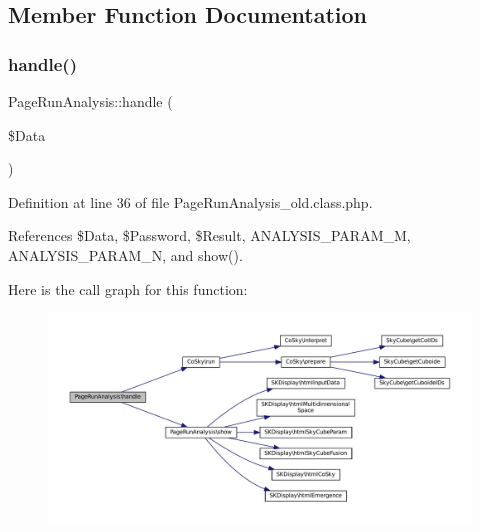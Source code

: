 \subsection{Member Function Documentation}
\mbox{\label{class_page_run_analysis_a568bf81b0bfacd815f07ef353836b64c}} 
\subsubsection{\texorpdfstring{handle()}{handle()}\hspace{0.1cm}{\footnotesize\ttfamily [1/2]}}
{\footnotesize\ttfamily Page\+Run\+Analysis\+::handle (\begin{DoxyParamCaption}\item[{}]{\$\+Data }\end{DoxyParamCaption})\hspace{0.3cm}{\ttfamily [protected]}}



Definition at line 36 of file Page\+Run\+Analysis\+\_\+old.\+class.\+php.



References \$\+Data, \$\+Password, \$\+Result, A\+N\+A\+L\+Y\+S\+I\+S\+\_\+\+P\+A\+R\+A\+M\+\_\+M, A\+N\+A\+L\+Y\+S\+I\+S\+\_\+\+P\+A\+R\+A\+M\+\_\+N, and show().

Here is the call graph for this function\+:
\nopagebreak
\begin{figure}[H]
\begin{center}
\leavevmode
\includegraphics[width=350pt]{class_page_run_analysis_a568bf81b0bfacd815f07ef353836b64c_cgraph}
\end{center}
\end{figure}
\mbox{\label{class_page_run_analysis_a568bf81b0bfacd815f07ef353836b64c}} 
